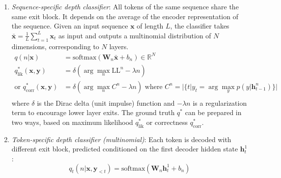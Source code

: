 \documentclass[12pt]{article}
\begin{document}
\begin{enumerate}
\item \emph{Sequence-specific depth classifier}: All tokens of the same sequence share the same exit block. It depends on the average of the encoder representation of the sequence. Given an input sequence $\mathbf{x}$ of length $L$, the classifier takes $\bar{\mathbf{x}} = \frac{1}{L} \sum_{t=1}^L \mathbf{x}_t$ as input and outputs a multinomial distribution of $N$ dimensions, corresponding to $N$ layers.
\[
\begin{aligned}
q(n \vert \mathbf{x}) &=\text{softmax}(\mathbf{W}_n \bar{\mathbf{x}} + b_n) \in \mathbb{R}^N \\
q_\text{lik}^*(\mathbf{x}, \mathbf{y}) &= \delta(\arg\max_n \text{LL}^n - \lambda n) \\
\text{or }q_\text{corr}^*(\mathbf{x}, \mathbf{y}) &= \delta(\arg\max_n C^n - \lambda n) \text{ where }C^n = \vert\{t \vert y_t = \arg\max_y p(y \vert \mathbf{h}^n_{t-1})\}\vert \\
\end{aligned}
\]
where $\delta$ is the Dirac delta (unit impulse) function and $-\lambda n$ is a regularization term to encourage lower layer exits. The ground truth $q^*$ can be prepared in two ways, based on maximum likelihood $q_\text{lik}^*$ or correctness $q_\text{corr}^*$.

\item \emph{Token-specific depth classifier (multinomial)}: Each token is decoded with different exit block, predicted conditioned on the first decoder hidden state $\mathbf{h}^1_t$:
\[
q_t(n \vert \mathbf{x}, \mathbf{y}_{< t}) = \text{softmax}(\mathbf{W}_n \mathbf{h}^1_t + b_n)
\]


\end{enumerate}
\end{document}
